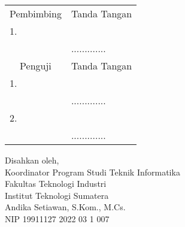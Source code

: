 \begin{center}
	\justify
    \setlength{\tabcolsep}{0pt}
    \begin{tabular}{ m{0.5cm}  m{} >{\centering\arraybackslash}m{}}
        \multicolumn{2}{c}{\hspace*{-50pt}Pembimbing} & \multicolumn{1}{c}{Tanda Tangan} \\[2pt]
		1. & \printnamadosbinga & \\
		 & \printnipdosbinga & ............. \\[4pt]
		\multicolumn{2}{c}{\hspace*{-70pt}Penguji} & \multicolumn{1}{c}{Tanda Tangan} \\[2pt]
		1. & \printnamapengujia & \\
		& \printnippengujia & ............. \\[4pt]
		2. & \printnamapengujib & \\
		& \printnippengujib & ............. \\
    \end{tabular}

	\begin{center}
		\fontsize{10pt}{10pt}
        \vspace{0.35cm}
		Disahkan oleh,\\
		Koordinator Program Studi Teknik Informatika\\
		Fakultas Teknologi Industri\\
		Institut Teknologi Sumatera
		\vspace{1cm}\\
		Andika Setiawan, S.Kom., M.Cs. \\ %
		NIP 19911127 2022 03 1 007 \\
	\end{center}
	\vfill

\end{center}
\clearpage